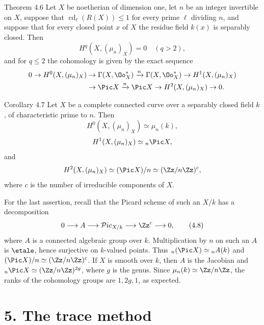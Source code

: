 \begin{statement}{Theorem 4.6}
Let \(X\) be noetherian of dimension one, let \(n\) be an integer invertible on \(X\), suppose that \(\operatorname{cd}_\ell(R(X))\leq1\) for every prime \(\ell\) dividing \(n\), and suppose that for every closed point \(x\) of \(X\) the residue field \(k(x)\) is separably closed. Then
\[
H^q(X,(\mu_n)_X)=0\quad(q>2),
\]
and for \(q\leq2\) the cohomology is given by the exact sequence
\[
\begin{aligned}
0\to H^0(X,(\mu_n)_X)&\to \Gamma(X,\Oo_X^*)\xrightarrow{n}\Gamma(X,\Oo_X^*)\to H^1(X,(\mu_n)_X)\\
&\to \Pic X\xrightarrow{n}\Pic X\to H^2(X,(\mu_n)_X)\to0.
\end{aligned}
\]
\end{statement}

\begin{statement}{Corollary 4.7}
Let \(X\) be a complete connected curve over a separably closed field \(k\), of characteristic prime to \(n\). Then
\[
H^0(X,(\mu_n)_X)\simeq\mu_n(k),
\]
\[
H^1(X,(\mu_n)_X)\simeq {}_n\Pic X,
\]
and
\[
H^2(X,(\mu_n)_X)\simeq (\Pic X)/n\simeq (\Zz/n\Zz)^c,
\]
where \(c\) is the number of irreducible components of \(X\).
\end{statement}

For the last assertion, recall that the Picard scheme of such an \(X/k\) has a decomposition
\[
0\longrightarrow A\longrightarrow \mathcal{P}ic_{X/k}\longrightarrow \Zz^c\longrightarrow 0,
\tag{4.8}
\]
where \(A\) is a connected algebraic group over \(k\). Multiplication by \(n\) on such an \(A\) is \(\etale\), hence surjective on \(k\)-valued points. Thus \({}_n(\Pic X)\simeq {}_nA(k)\) and \((\Pic X)/n\simeq(\Zz/n\Zz)^c\). If \(X\) is smooth over \(k\), then \(A\) is the Jacobian and \({}_n\Pic X\simeq(\Zz/n\Zz)^{2g}\), where \(g\) is the genus. Since \(\mu_n(k)\simeq\Zz/n\Zz\), the ranks of the cohomology groups are \(1,2g,1\), as expected.

\section*{5. The trace method}

